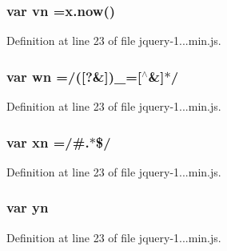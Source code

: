\subsubsection[{vn}]{\setlength{\rightskip}{0pt plus 5cm}var vn =x.\+now()}\label{_scripts_2jquery-1_810_82_8min_8js_a4d3ea42bab8c1a36105c29b5a098a050}


Definition at line 23 of file jquery-\/1...\+min.\+js.

\hypertarget{_scripts_2jquery-1_810_82_8min_8js_aaa87ec69cc4d144180280e906cac73f1}{}
\subsubsection[{wn}]{\setlength{\rightskip}{0pt plus 5cm}var wn =/(\mbox{[}?\&\mbox{]})\+\_\+=\mbox{[}$^\wedge$\&\mbox{]}$\ast$/}\label{_scripts_2jquery-1_810_82_8min_8js_aaa87ec69cc4d144180280e906cac73f1}


Definition at line 23 of file jquery-\/1...\+min.\+js.

\hypertarget{_scripts_2jquery-1_810_82_8min_8js_a5d600963c6441f15f548bc0b847b6a04}{}
\subsubsection[{xn}]{\setlength{\rightskip}{0pt plus 5cm}var xn =/\#.$\ast$\$/}\label{_scripts_2jquery-1_810_82_8min_8js_a5d600963c6441f15f548bc0b847b6a04}


Definition at line 23 of file jquery-\/1...\+min.\+js.

\hypertarget{_scripts_2jquery-1_810_82_8min_8js_a390d7ca752a48e31e8ffb5209c0a4cd6}{}
\subsubsection[{yn}]{\setlength{\rightskip}{0pt plus 5cm}var yn}\label{_scripts_2jquery-1_810_82_8min_8js_a390d7ca752a48e31e8ffb5209c0a4cd6}


Definition at line 23 of file jquery-\/1...\+min.\+js.


